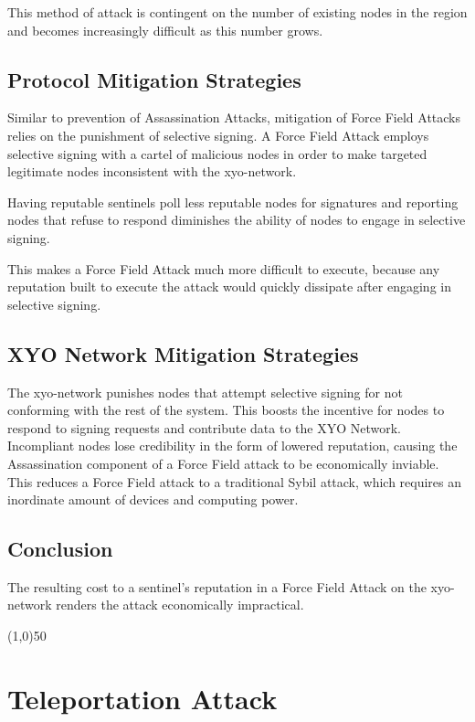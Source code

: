 \documentclass{article}
\begin{document}
This method of attack is contingent on the number of existing nodes in the region and becomes increasingly difficult as this number grows.

\subsection{Protocol Mitigation Strategies}

Similar to prevention of Assassination Attacks, mitigation of Force Field Attacks relies on the punishment of selective signing. A Force Field Attack employs selective signing with a cartel of malicious nodes in order to make targeted legitimate nodes inconsistent with the \Gls{xyo-network}. 

Having reputable \Glspl{sentinel} poll less reputable nodes for signatures and reporting nodes that refuse to respond diminishes the ability of nodes to engage in selective signing.

This makes a Force Field Attack much more difficult to execute, because any reputation built to execute the attack would quickly dissipate after engaging in selective signing.

\subsection{XYO Network Mitigation Strategies}

The \Gls{xyo-network} punishes nodes that attempt selective signing for not conforming with the rest of the system. This boosts the incentive for nodes to respond to signing requests and contribute data to the XYO Network. Incompliant nodes lose credibility in the form of lowered reputation, causing the Assassination component of a Force Field attack to be economically inviable. This reduces a Force Field attack to a traditional Sybil attack, which requires an inordinate amount of devices and computing power.

\subsection{Conclusion}

The resulting cost to a \Gls{sentinel}'s reputation in a Force Field Attack on the \Gls{xyo-network} renders the attack economically impractical.

\begin{center}
\line(1,0){50}
\end{center}

\section{Teleportation Attack}
\end{document}
